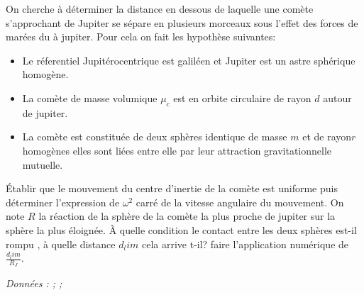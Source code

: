 \begin{Exercise}[title=(*) Limite de Roche]
On cherche à déterminer la distance en dessous de laquelle une comète s'approchant de Jupiter se sépare en plusieurs morceaux sous l'effet des forces de marées du à jupiter. Pour cela on fait les hypothèse suivantes:
\begin{itemize}
	\item Le réferentiel Jupitérocentrique est galiléen et Jupiter est un astre sphérique homogène.
	\item La comète de masse volumique $\mu_c$ est en orbite circulaire de rayon $d$ autour de jupiter.
	\item La comète est constituée de deux sphères identique de masse $m$ et de rayon$r$ homogènes elles sont liées entre elle par leur attraction gravitationnelle mutuelle.
    \end{itemize}
    \begin{center}
    \end{center}
\Question Établir que le mouvement du centre d'inertie de la comète est uniforme puis déterminer l'expression de $\omega^2$ carré de la vitesse angulaire du mouvement.
\Question On note $R$ la réaction de la sphère  de la comète la plus proche de jupiter sur la sphère la plus éloignée. À quelle condition le contact entre les deux sphères est-il rompu , à quelle distance $d_lim$ cela arrive t-il?
\Question faire l'application numérique de $\frac{d_lim}{R_J}$.

\emph{Données : ; ; }
\end{Exercise}
